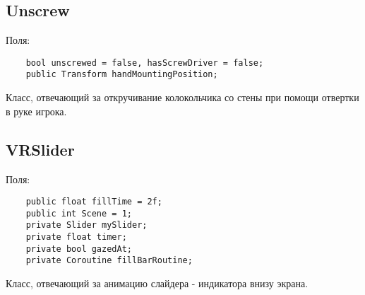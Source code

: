 \subsection{Unscrew}
Поля:\\
\begin{small}
    \begin{verbatim}
    bool unscrewed = false, hasScrewDriver = false;
    public Transform handMountingPosition;
    \end{verbatim}
\end{small}
Класс, отвечающий за откручивание колокольчика со стены при помощи отвертки в руке игрока.

\subsection{VRSlider}
Поля:\\
\begin{small}
    \begin{verbatim}
    public float fillTime = 2f;
    public int Scene = 1;
    private Slider mySlider;
    private float timer;
    private bool gazedAt;
    private Coroutine fillBarRoutine;
    \end{verbatim}
\end{small}
Класс, отвечающий за анимацию слайдера - индикатора внизу экрана.

